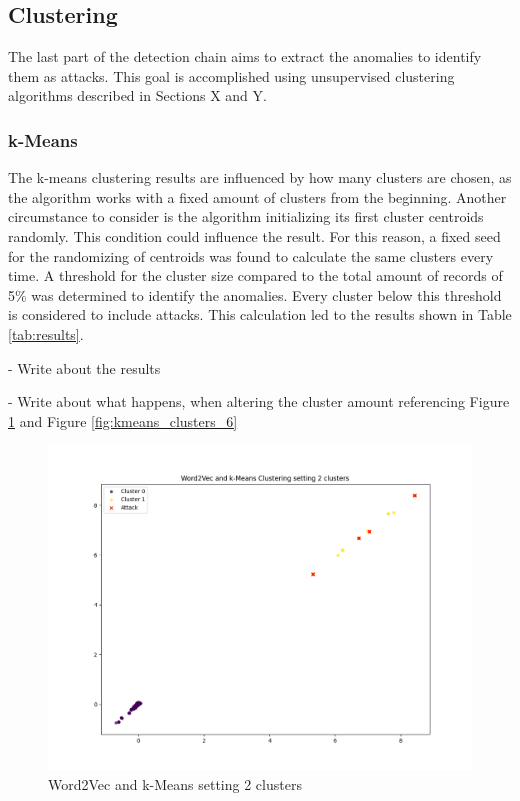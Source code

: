 \documentclass[
    fontsize=12pt,
    headings=small,
    parskip=half,           %
    bibliography=totoc,
    numbers=noenddot,       %
    open=any,               %
    ]{scrreprt}
\begin{document}
\subsection{Clustering}
The last part of the detection chain aims to extract the anomalies to identify them as attacks. This goal is accomplished using unsupervised clustering algorithms described in Sections X and Y. 

\subsubsection{k-Means}
The k-means clustering results are influenced by how many clusters are chosen, as the algorithm works with a fixed amount of clusters from the beginning. Another circumstance to consider is the algorithm initializing its first cluster centroids randomly. This condition could influence the result. For this reason, a fixed seed for the randomizing of centroids was found to calculate the same clusters every time. A threshold for the cluster size compared to the total amount of records of 5\% was determined to identify the anomalies. Every cluster below this threshold is considered to include attacks. This calculation led to the results shown in Table \ref{tab:results}.

- Write about the results

- Write about what happens, when altering the cluster amount referencing Figure \ref{fig:kmeans_clusters_2} and Figure \ref{fig:kmeans_clusters_6}


\begin{figure}[H]
	\caption{Word2Vec and k-Means setting 2 clusters}
	\label{fig:kmeans_clusters_2}
	\sffamily\footnotesize
	\includegraphics[width=1\textwidth]{pic/k_means_2.png}
	\unitlength=0.75mm
	\linethickness{0.4pt}
\end{figure}
\end{document}
